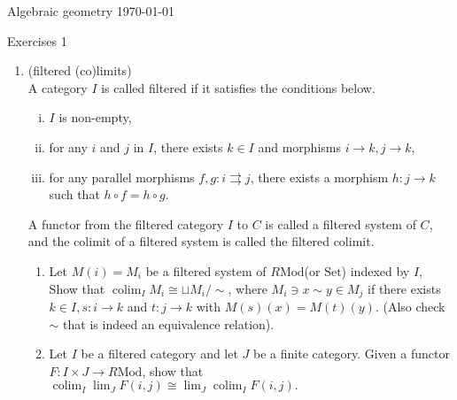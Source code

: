 \documentclass[a4paper,11pt]{article}
\def\mrm#1{\mathrm{#1}}
\def\Mod#1{#1\mathrm{Mod}}
\DeclareMathOperator{\colim}{colim}
\begin{document}
{\small Algebraic geometry \hfill \today \\}
\begin{center}
\Huge Exercises 1
\end{center}
\vskip0.6cm
\begin{enumerate}[1.]
\item (filtered (co)limits) \\
A category $I$ is called filtered if it satisfies the conditions below.
\begin{enumerate}[(i)]
    \item  $I$ is non-empty,
    \item  for any $i$ and $j$ in $I$, there exists $k \in I$ and morphisms $i \to k, j \to k$,
    \item for any parallel morphisms $f,g: i \rightrightarrows  j$, there exists a morphism $h: j \to
    k$ such that $h \circ  f = h \circ g$.
\end{enumerate}
A functor from the filtered category $I$ to $C$ is called a filtered system of $C$, and the colimit of a filtered system is called the filtered colimit.
\begin{enumerate}
    \item Let $M(i)=M_i$ be a filtered system of $\Mod{R}$(or $\mrm{Set}$) indexed by $I$, Show that $\colim_I M_i\cong \sqcup M_i/ \sim$, where $M_i \ni x \sim y \in M_j$ if there exists $k \in I, s: i \to k$ and $ t: j \to k$
    with $ M(s)(x) = M(t)(y)$. (Also check $\sim$ that is indeed an equivalence relation).
    \item Let $I$ be a filtered category and let $J$ be a finite category. Given a functor $F: I\times J \to \Mod{R}$, show that $\colim_I\lim_J F(i,j)\cong\lim_J\colim_I F(i,j).$
\end{enumerate}


\end{enumerate}
\end{document}
